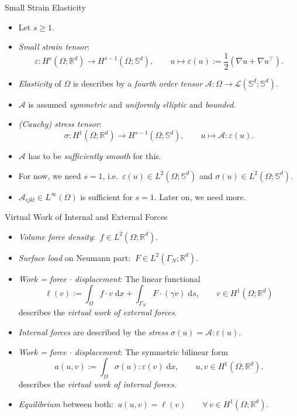 \documentclass[10pt,aspectratio=169]{beamer}
\def\R{{\mathbb R}}
\def\S{{\mathbb S}}
\def\cA{{\mathcal A}}
\def\cL{{\mathcal L}}
\def\d{{\mathrm{d}}}
\def\dx{{\d x}}
\def\ds{{\d s}}
\begin{document}
\begin{frame}{Small Strain Elasticity}
	\begin{itemize}
		\item Let $s\ge 1$.
		\item {\em Small strain tensor}:
		      \begin{equation*}
			      \varepsilon:H^s(\Omega;\R^d)\to H^{s-1}(\Omega;\S^d),\qquad u\mapsto \varepsilon(u):= \frac{1}{2}\left(\nabla u + \nabla u^\top\right).
		      \end{equation*}

		\item {\em Elasticity} of $\Omega$ is describes by a {\em fourth order tensor} $\cA:\Omega\to\cL(\S^d;\S^d)$.
		\item $\cA$ is assumed {\em symmetric} and {\em uniformly elliptic} and {\em bounded}.
		\item {\em (Cauchy) stress tensor}:
		      \begin{equation*}
			      \sigma: H^1(\Omega;\R^d)\to H^{s-1}(\Omega;\S^d),\qquad u\mapsto \cA : \varepsilon(u).
		      \end{equation*}
		\item $\cA$ has to be {\em sufficiently smooth} for this.
		\item For now, we need $s = 1$, i.e.\ $\varepsilon(u)\in L^2(\Omega;\S^d)$ and $\sigma(u)\in L^2(\Omega;\S^d)$.
		\item $\cA_{ijkl}\in L^\infty(\Omega)$ is sufficient for $s = 1$. Later on, we need more.
	\end{itemize}
\end{frame}

\begin{frame}{Virtual Work of Internal and External Forces}
	\begin{itemize}
		\item {\em Volume force density}: $\ f\in L^2(\Omega;\R^d)$.
		\item {\em Surface load} on Neumann part: $\ F\in L^2(\Gamma_N;\R^d)$.
		\item {\em Work = force $\cdot$ displacement}: The linear functional
		      \begin{equation*}
			      \ell(v)
			      :=
			      \int_\Omega f\cdot v\;\dx
			      +
			      \int_{\Gamma_N} F\cdot (\gamma v)\;\ds,\qquad v\in H^1(\Omega;\R^d)
		      \end{equation*}
		      describes the {\em virtual work of external forces}.
		\item {\em Internal forces} are described by the {\em stress} $\sigma(u) = \cA:\varepsilon(u)$.
		\item {\em Work = force $\cdot$ displacement}: The symmetric bilinear form
		      \begin{equation*}
			      a(u,v)
			      :=
			      \int_\Omega \sigma(u):\varepsilon(v)\;\dx,\qquad u,v\in H^1(\Omega;\R^d).
		      \end{equation*}
		      describes the {\em virtual work of internal forces}.
		\item {\em Equilibrium} between both: $\ a(u,v) = \ell(v)\qquad\forall\,v\in H^1(\Omega;\R^d)$.
	\end{itemize}
\end{frame}
\end{document}
